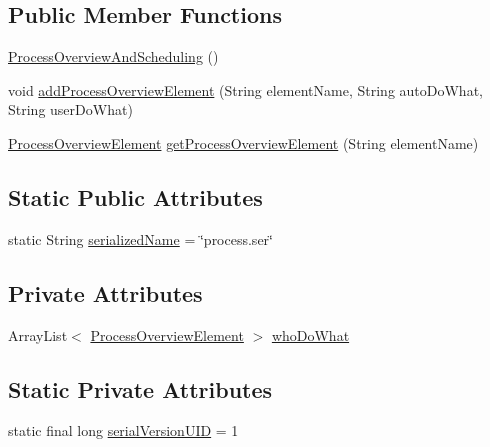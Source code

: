 \subsection*{Public Member Functions}
\begin{DoxyCompactItemize}
\item 
\hyperlink{classit_1_1isislab_1_1masonhelperdocumentation_1_1_o_d_d_1_1_process_overview_and_scheduling_a082a6cd7cc78f78d0f7fad3b70abd468}{Process\-Overview\-And\-Scheduling} ()
\item 
void \hyperlink{classit_1_1isislab_1_1masonhelperdocumentation_1_1_o_d_d_1_1_process_overview_and_scheduling_a37cb5ebe1a6f66352878173a67b8056f}{add\-Process\-Overview\-Element} (String element\-Name, String auto\-Do\-What, String user\-Do\-What)
\item 
\hyperlink{classit_1_1isislab_1_1masonhelperdocumentation_1_1_o_d_d_1_1_process_overview_element}{Process\-Overview\-Element} \hyperlink{classit_1_1isislab_1_1masonhelperdocumentation_1_1_o_d_d_1_1_process_overview_and_scheduling_a9084b96891933dd08c76d42e2827e39c}{get\-Process\-Overview\-Element} (String element\-Name)
\end{DoxyCompactItemize}
\subsection*{Static Public Attributes}
\begin{DoxyCompactItemize}
\item 
static String \hyperlink{classit_1_1isislab_1_1masonhelperdocumentation_1_1_o_d_d_1_1_process_overview_and_scheduling_ae9fbdf58650557068942b5247ea74065}{serialized\-Name} = \char`\"{}process.\-ser\char`\"{}
\end{DoxyCompactItemize}
\subsection*{Private Attributes}
\begin{DoxyCompactItemize}
\item 
Array\-List$<$ \hyperlink{classit_1_1isislab_1_1masonhelperdocumentation_1_1_o_d_d_1_1_process_overview_element}{Process\-Overview\-Element} $>$ \hyperlink{classit_1_1isislab_1_1masonhelperdocumentation_1_1_o_d_d_1_1_process_overview_and_scheduling_a19435fe761c50ba80b9a5ca705102e21}{who\-Do\-What}
\end{DoxyCompactItemize}
\subsection*{Static Private Attributes}
\begin{DoxyCompactItemize}
\item 
static final long \hyperlink{classit_1_1isislab_1_1masonhelperdocumentation_1_1_o_d_d_1_1_process_overview_and_scheduling_ad089f2b8fdb6f8a7fba47808dc0ec7ae}{serial\-Version\-U\-I\-D} = 1
\end{DoxyCompactItemize}


